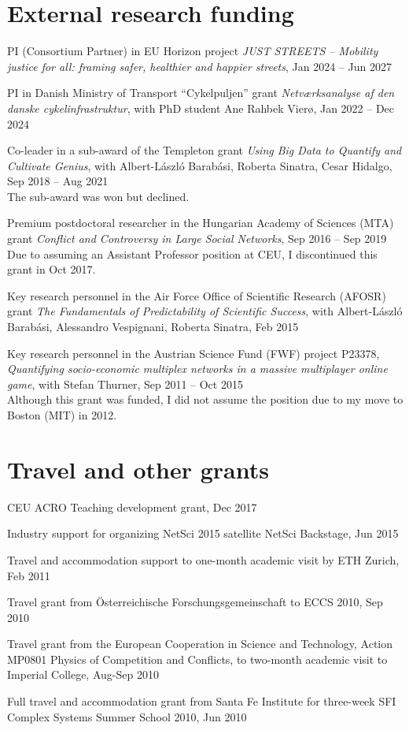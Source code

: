 \documentclass[10pt,a4paper]{article}
\renewenvironment{itemize}{
  \begin{list}{}{
    \setlength{\leftmargin}{1.5em}
    \setlength{\itemsep}{0.25em}
    \setlength{\parskip}{0pt}
    \setlength{\parsep}{0.25em}
  }
}{
  \end{list}
}
\begin{document}
\section*{External research funding}
\begin{itemize} 
\item{PI (Consortium Partner) in EU Horizon project \emph{JUST STREETS -- Mobility justice for all: framing safer, healthier and happier streets}, Jan 2024 -- Jun 2027}
\item{PI in Danish Ministry of Transport ``Cykelpuljen'' grant \textit{Netværksanalyse af den danske cykelinfrastruktur}, with PhD student Ane Rahbek Vierø, Jan 2022 -- Dec 2024}
\item{Co-leader in a sub-award of the Templeton grant \textit{Using Big Data to Quantify and Cultivate Genius}, with Albert-L\'aszl\'o Barab\'asi, Roberta Sinatra, Cesar Hidalgo, Sep 2018 -- Aug 2021\\
The sub-award was won but declined.}
\item{Premium postdoctoral researcher in the Hungarian Academy of Sciences (MTA) grant \textit{Conflict and Controversy in Large Social Networks}, Sep 2016 -- Sep 2019}\\
Due to assuming an Assistant Professor position at CEU, I discontinued this grant in Oct 2017.
\item{Key research personnel in the Air Force Office of Scientific Research (AFOSR) grant \textit{The Fundamentals of Predictability of Scientific Success}, with Albert-L\'aszl\'o Barab\'asi, Alessandro Vespignani, Roberta Sinatra, Feb 2015}
\item{Key research personnel in the Austrian Science Fund (FWF) project P23378, \textit{Quantifying socio-economic multiplex networks in a massive multiplayer online game}, with Stefan Thurner, Sep 2011 -- Oct 2015\\
Although this grant was funded, I did not assume the position due to my move to Boston (MIT) in 2012.} 
\end{itemize}

\section*{Travel and other grants}
\begin{itemize} 
\item{CEU ACRO Teaching development grant, Dec 2017}
\item{Industry support for organizing NetSci 2015 satellite NetSci Backstage, Jun 2015}
\item{Travel and accommodation support to one-month academic visit by ETH Zurich, Feb 2011}
\item{Travel grant from \"Osterreichische Forschungsgemeinschaft to ECCS 2010, Sep 2010}
\item{Travel grant from the European Cooperation in Science and Technology, Action MP0801 Physics of Competition and Conflicts, to two-month academic visit to Imperial College, Aug-Sep 2010}
\item{Full travel and accommodation grant from Santa Fe Institute for three-week SFI Complex Systems Summer School 2010, Jun 2010}
\end{itemize}
\end{document}
